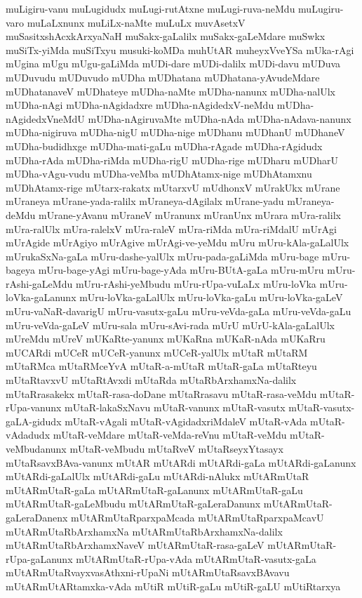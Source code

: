 {muLigiru-vanu
muLugidudx
muLugi-rutAtxne
muLugi-ruva-neMdu
muLugiru-varo
muLaLxnunx
muLiLx-naMte
muLuLx
muvAsetxV
muSasitxshAcxkArxyaNaH
muSakx-gaLalilx
muSakx-gaLeMdare
muSwkx
muSiTx-yiMda
muSiTxyu
musuki-koMDa
muhUtAR
muheyxVveYSa
mUka-rAgi
mUgina
mUgu
mUgu-gaLiMda
mUDi-dare
mUDi-dalilx
mUDi-davu
mUDuva
mUDuvudu
mUDuvudo
mUDha
mUDhatana
mUDhatana-yAvudeMdare
mUDhatanaveV
mUDhateye
mUDha-naMte
mUDha-nanunx
mUDha-nalUlx
mUDha-nAgi
mUDha-nAgidadxre
mUDha-nAgidedxV-neMdu
mUDha-nAgidedxVneMdU
mUDha-nAgiruvaMte
mUDha-nAda
mUDha-nAdava-nanunx
mUDha-nigiruva
mUDha-nigU
mUDha-nige
mUDhanu
mUDhanU
mUDhaneV
mUDha-budidhxge
mUDha-mati-gaLu
mUDha-rAgade
mUDha-rAgidudx
mUDha-rAda
mUDha-riMda
mUDha-rigU
mUDha-rige
mUDharu
mUDharU
mUDha-vAgu-vudu
mUDha-veMba
mUDhAtamx-nige
mUDhAtamxnu
mUDhAtamx-rige
mUtarx-rakatx
mUtarxvU
mUdhonxV
mUrakUkx
mUrane
mUraneya
mUrane-yada-ralilx
mUraneya-dAgilalx
mUrane-yadu
mUraneya-deMdu
mUrane-yAvanu
mUraneV
mUranunx
mUranUnx
mUrara
mUra-ralilx
mUra-ralUlx
mUra-ralelxV
mUra-raleV
mUra-riMda
mUra-riMdalU
mUrAgi
mUrAgide
mUrAgiyo
mUrAgive
mUrAgi-ve-yeMdu
mUru
mUru-kAla-gaLalUlx
mUrukaSxNa-gaLa
mUru-dashe-yalUlx
mUru-pada-gaLiMda
mUru-bage
mUru-bageya
mUru-bage-yAgi
mUru-bage-yAda
mUru-BUtA-gaLa
mUru-mUru
mUru-rAshi-gaLeMdu
mUru-rAshi-yeMbudu
mUru-rUpa-vuLaLx
mUru-loVka
mUru-loVka-gaLanunx
mUru-loVka-gaLalUlx
mUru-loVka-gaLu
mUru-loVka-gaLeV
mUru-vaNaR-davarigU
mUru-vasutx-gaLu
mUru-veVda-gaLa
mUru-veVda-gaLu
mUru-veVda-gaLeV
mUru-sala
mUru-sAvi-rada
mUrU
mUrU-kAla-gaLalUlx
mUreMdu
mUreV
mUKaRte-yanunx
mUKaRna
mUKaR-nAda
mUKaRru
mUCARdi
mUCeR
mUCeR-yanunx
mUCeR-yalUlx
mUtaR
mUtaRM
mUtaRMca
mUtaRMceYvA
mUtaR-a-mUtaR
mUtaR-gaLa
mUtaRteyu
mUtaRtavxvU
mUtaRtAvxdi
mUtaRda
mUtaRbArxhamxNa-dalilx
mUtaRrasakekx
mUtaR-rasa-doDane
mUtaRrasavu
mUtaR-rasa-veMdu
mUtaR-rUpa-vanunx
mUtaR-lakaSxNavu
mUtaR-vanunx
mUtaR-vasutx
mUtaR-vasutx-gaLA-gidudx
mUtaR-vAgali
mUtaR-vAgidadxriMdaleV
mUtaR-vAda
mUtaR-vAdadudx
mUtaR-veMdare
mUtaR-veMda-reVnu
mUtaR-veMdu
mUtaR-veMbudanunx
mUtaR-veMbudu
mUtaRveV
mUtaRseyxYtasayx
mUtaRsavxBAva-vanunx
mUtAR
mUtARdi
mUtARdi-gaLa
mUtARdi-gaLanunx
mUtARdi-gaLalUlx
mUtARdi-gaLu
mUtARdi-nAlukx
mUtARmUtaR
mUtARmUtaR-gaLa
mUtARmUtaR-gaLanunx
mUtARmUtaR-gaLu
mUtARmUtaR-gaLeMbudu
mUtARmUtaR-gaLeraDanunx
mUtARmUtaR-gaLeraDanenx
mUtARmUtaRparxpaMcada
mUtARmUtaRparxpaMcavU
mUtARmUtaRbArxhamxNa
mUtARmUtaRbArxhamxNa-dalilx
mUtARmUtaRbArxhamxNaveV
mUtARmUtaR-rasa-gaLeV
mUtARmUtaR-rUpa-gaLanunx
mUtARmUtaR-rUpa-vAda
mUtARmUtaR-vasutx-gaLa
mUtARmUtaRvayxvasAthxni-rUpaNi
mUtARmUtaRsavxBAvavu
mUtARmUtARtamxka-vAda
mUtiR
mUtiR-gaLu
mUtiR-gaLU
mUtiRtarxya
}

